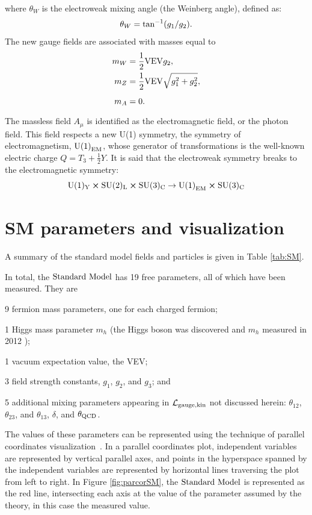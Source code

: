 where $\theta_W$ is the electroweak mixing angle (the Weinberg angle), defined as:
\begin{equation}
\theta_{W}={\rm tan}^{-1}(g_1/g_2).
\end{equation}
The new gauge fields are associated with masses equal to
\begin{align}
\vps m_{W} &= \frac{1}{2}{\rm VEV}g_{2}, \\
\vps m_{Z} &= \frac{1}{2}{\rm VEV}\sqrt{g_{1}^{2}+g_{2}^{2}},\\
\vps m_{A} &= 0.
\end{align}
The massless field $A_{\mu}$ is identified as the electromagnetic field, or the photon field. This field respects a new U(1) symmetry, the symmetry of electromagnetism, ${\rm U(1)}_{\rm EM}$, whose generator of transformations is the well-known electric charge $Q=T_3+\frac{1}{2}Y$. It is said that the electroweak symmetry breaks to the electromagnetic symmetry:
\begin{equation}
\rm U(1)_{Y}\cross\rm SU(2)_{L}\cross\rm SU(3)_{C}\rightarrow{\rm U(1)}_{\rm EM}\cross\rm SU(3)_{C}
\end{equation}

\section{SM parameters and visualization}
\label{sec:parcor}
A summary of the standard model fields and particles is given in Table \ref{tab:SM}.  

In total, the $\text{Standard\ Model}$ has 19 free parameters, all of which have been measured. They are
\begin{itemize}
\item{9 fermion mass parameters, one for each charged fermion;}
\item{1 Higgs mass parameter $m_h$ (the Higgs boson was discovered and $m_h$ measured in 2012 \cite{Chatrchyan:2012xdj}); 
\item 1 vacuum expectation value, the VEV;}
\item{3 field strength constants, $g_1$, $g_2$, and $g_3$}; and
\item{5 additional mixing parameters appearing in $\mathcal{L}_{\rm gauge, kin}$ not discussed herein: $\theta_{12}$, $\theta_{23}$, and $\theta_{13}$, $\delta$, and $\theta_{\rm QCD}$.}
\end{itemize}
The values of these parameters can be represented using the technique of parallel coordinates visualization~\cite{bib:parcor}. In a parallel coordinates plot, independent variables are represented by vertical parallel axes, and points in the hyperspace spanned by the independent variables are represented by horizontal lines traversing the plot from left to right. In Figure \ref{fig:parcorSM}, the $\text{Standard\ Model}$ is represented as the red line, intersecting each axis at the value of the parameter assumed by the theory, in this case the measured value.  

